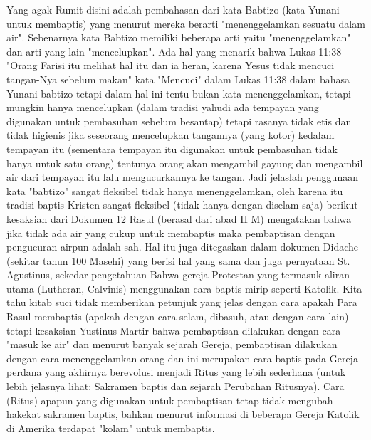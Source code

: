 Yang agak Rumit disini adalah pembahasan dari kata Babtizo (kata Yunani untuk membaptis) yang menurut mereka berarti "menenggelamkan sesuatu dalam air". Sebenarnya kata Babtizo memiliki beberapa arti yaitu "menenggelamkan" dan arti yang lain "mencelupkan". Ada hal yang menarik bahwa Lukas 11:38 "Orang Farisi itu melihat hal itu dan ia heran, karena Yesus tidak mencuci tangan-Nya sebelum makan" kata "Mencuci" dalam Lukas 11:38 dalam bahasa Yunani babtizo tetapi dalam hal ini tentu bukan kata menenggelamkan, tetapi mungkin hanya mencelupkan (dalam tradisi yahudi ada tempayan yang digunakan untuk pembasuhan sebelum besantap) tetapi rasanya tidak etis dan tidak higienis jika seseorang mencelupkan tangannya (yang kotor) kedalam tempayan itu (sementara tempayan itu digunakan untuk pembasuhan tidak hanya untuk satu orang) tentunya orang akan mengambil gayung dan mengambil air dari tempayan itu lalu mengucurkannya ke tangan. Jadi jelaslah penggunaan kata "babtizo" sangat fleksibel tidak hanya menenggelamkan, oleh karena itu tradisi baptis Kristen sangat fleksibel (tidak hanya dengan diselam saja) berikut kesaksian dari Dokumen 12 Rasul (berasal dari abad II M) mengatakan bahwa jika tidak ada air yang cukup untuk membaptis maka pembaptisan dengan pengucuran airpun adalah sah. Hal itu juga ditegaskan dalam dokumen Didache (sekitar tahun 100 Masehi) yang berisi hal yang sama dan juga pernyataan St. Agustinus, sekedar pengetahuan Bahwa gereja Protestan yang termasuk aliran utama (Lutheran, Calvinis) menggunakan cara baptis mirip seperti Katolik. Kita tahu kitab suci tidak memberikan petunjuk yang jelas dengan cara apakah Para Rasul membaptis (apakah dengan cara selam, dibasuh, atau dengan cara lain) tetapi kesaksian Yustinus Martir bahwa pembaptisan dilakukan dengan cara "masuk ke air" dan menurut banyak sejarah Gereja, pembaptisan dilakukan dengan cara menenggelamkan orang dan ini merupakan cara baptis pada Gereja perdana yang akhirnya berevolusi menjadi Ritus yang lebih sederhana (untuk lebih jelasnya lihat: Sakramen baptis dan sejarah Perubahan Ritusnya). Cara (Ritus) apapun yang digunakan untuk pembaptisan tetap tidak mengubah hakekat sakramen baptis, bahkan menurut informasi di beberapa Gereja Katolik di Amerika terdapat "kolam" untuk membaptis. 

